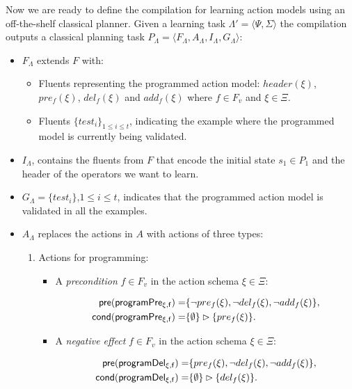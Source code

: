 \documentclass[letterpaper]{article} %
\newcommand{\tup}[1]{{\langle #1 \rangle}}
\newcommand{\pre}{\mathsf{pre}}     %
\newcommand{\cond}{\mathsf{cond}}   %
\begin{document}
Now we are ready to define the compilation for learning action models using an off-the-shelf classical planner. Given a learning task $\Lambda'=\tup{\Psi,\Sigma}$ the compilation outputs a classical planning task $P_{\Lambda}=\tup{F_{\Lambda},A_{\Lambda},I_{\Lambda},G_{\Lambda}}$:
\begin{itemize}
\item $F_{\Lambda}$ extends $F$ with:
\begin{itemize}
\item Fluents representing the programmed action model: $header(\xi)$, $pre_f(\xi)$, $del_f(\xi)$ and $add_f(\xi)$ where $f\in F_v$ and $\xi \in \Xi$.
\item Fluents $\{test_i\}_{1\leq i\leq t}$, indicating the example where the programmed model is currently being validated.
\end{itemize}
\item $I_{\Lambda}$, contains the fluents from $F$ that encode the initial state $s_1\in P_1$ and the header of the operators we want to learn.
\item $G_{\Lambda}=\{test_i\}$,{\small $1\leq i\leq t$}, indicates that the programmed action model is validated in all the examples.
\item $A_{\Lambda}$ replaces the actions in $A$ with actions of three types:
\begin{enumerate}
\item Actions for programming:
\begin{itemize}
\item A {\em precondition} $f\in F_v$ in the action schema $\xi\in\Xi$:
\begin{small}
\begin{align*}
\hspace*{7pt}\pre(\mathsf{programPre_{\xi,f}})=&\{\neg pre_{f}(\xi),\neg del_{f}(\xi),\neg add_{f}(\xi)\},\\    
\cond(\mathsf{programPre_{\xi,f}})=&\{\emptyset\}\rhd\{pre_{f}(\xi)\}.
\end{align*}
\end{small}
\item A {\em negative effect} $f\in F_v$ in the action schema $\xi\in\Xi$:
\begin{small}
\begin{align*}
\hspace*{7pt}\pre(\mathsf{programDel_{\xi,f}})=&\{pre_{f}(\xi),\neg del_{f}(\xi),\neg add_{f}(\xi)\},\\                                                   
\cond(\mathsf{programDel_{\xi,f}})=&\{\emptyset\}\rhd\{del_{f}(\xi)\}.
\end{align*}
\end{small}


\end{itemize}
\end{enumerate}
\end{itemize}
\end{document}
